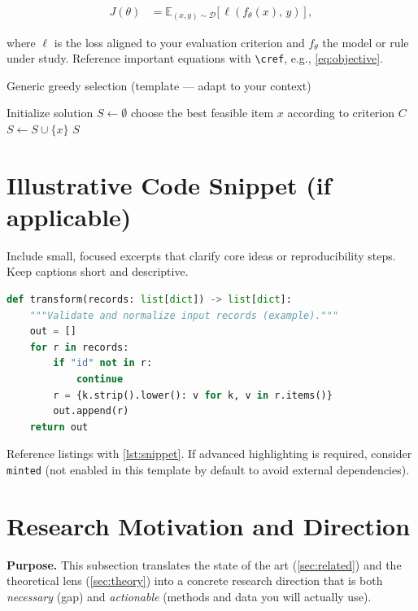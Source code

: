 \begin{align}
  \label{eq:objective}
  J(\theta) &= \mathbb{E}_{(x,y)\sim \mathcal{D}} \bigl[\, \ell(f_\theta(x),\, y)\, \bigr] \, ,
\end{align}

where $\ell$ is the loss aligned to your evaluation criterion and $f_\theta$ the model or rule under study. Reference important equations with \verb|\cref|, e.g., \cref{eq:objective}.

\begin{algorithm}[h]
\caption{Generic greedy selection (template — adapt to your context)}
\begin{algorithmic}[1]
  \State Initialize solution $S \gets \emptyset$
    \State choose the best feasible item $x$ according to criterion $C$
    \State $S \gets S \cup \{x\}$
  \EndWhile
  \State \Return $S$
\end{algorithmic}
\label{alg:example}
\end{algorithm}

\section{Illustrative Code Snippet (if applicable)}
\label{sec:listings}
Include small, focused excerpts that clarify core ideas or reproducibility steps. Keep captions short and descriptive.

\begin{lstlisting}[language=Python,caption={Example function signature for a data transform},label={lst:snippet},float=htbp]
def transform(records: list[dict]) -> list[dict]:
    """Validate and normalize input records (example)."""
    out = []
    for r in records:
        if "id" not in r:
            continue
        r = {k.strip().lower(): v for k, v in r.items()}
        out.append(r)
    return out
\end{lstlisting}

Reference listings with \cref{lst:snippet}. If advanced highlighting is required, consider \texttt{minted} (not enabled in this template by default to avoid external dependencies).

\section{Research Motivation and Direction}
\label{sec:motivation}
\textbf{Purpose.} This subsection translates the state of the art (\cref{sec:related}) and the theoretical lens (\cref{sec:theory}) into a concrete research direction that is both \emph{necessary} (gap) and \emph{actionable} (methods and data you will actually use).

